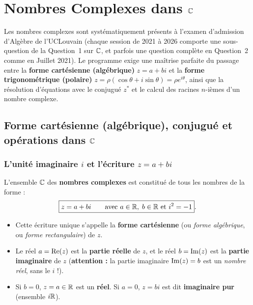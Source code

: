 \chapter{Nombres Complexes dans $\mathbb{C}$}

Les nombres complexes sont systématiquement présents à l'examen d'admission d'Algèbre de l'UCLouvain (chaque session de 2021 à 2026 comporte une sous-question de la Question~1 sur $\mathbb{C}$, et parfois une question complète en Question~2 comme en Juillet 2021). Le programme exige une maîtrise parfaite du passage entre la \textbf{forme cartésienne (algébrique)} $z = a + bi$ et la \textbf{forme trigonométrique (polaire)} $z = \rho(\cos\theta + i\sin\theta) = \rho e^{i\theta}$, ainsi que la résolution d'équations avec le conjugué $z^*$ et le calcul des racines $n$-ièmes d'un nombre complexe.

\section{Forme cartésienne (algébrique), conjugué et opérations dans $\mathbb{C}$}

\subsection{L'unité imaginaire $i$ et l'écriture $z = a + bi$}

\begin{definition}
L'ensemble $\mathbb{C}$ des \textbf{nombres complexes} est constitué de tous les nombres de la forme :
\[
    \boxed{z = a + bi \qquad \text{avec } a \in \mathbb{R},\; b \in \mathbb{R} \text{ et } i^2 = -1}.
\]
\begin{itemize}
    \item Cette écriture unique s'appelle la \textbf{forme cartésienne} (ou \emph{forme algébrique}, ou \emph{forme rectangulaire}) de $z$.
    \item Le réel $a = \operatorname{Re}(z)$ est la \textbf{partie réelle} de $z$, et le réel $b = \operatorname{Im}(z)$ est la \textbf{partie imaginaire} de $z$ (\textbf{attention :} la partie imaginaire $\operatorname{Im}(z) = b$ est un \emph{nombre réel}, sans le $i$ !).
    \item Si $b = 0$, $z = a \in \mathbb{R}$ est un \textbf{réel}. Si $a = 0$, $z = bi$ est dit \textbf{imaginaire pur} (ensemble $i\mathbb{R}$).
\end{itemize}
\end{definition}

